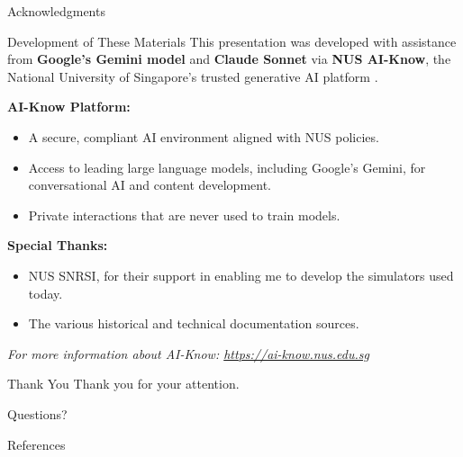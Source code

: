 \documentclass[aspectratio=169]{beamer}
\begin{document}
\begin{frame}[allowframebreaks]{Acknowledgments}
    \begin{block}{Development of These Materials}
        This presentation was developed with assistance 
		from \textbf{Google's Gemini model} and \textbf{Claude Sonnet} via \textbf{NUS AI-Know}, the 
		National University of Singapore's trusted generative AI platform 
		\cite{aiknow2026prke,
		aiknow2026gemini}.
    \end{block}

    \vspace{1em}
    \textbf{AI-Know Platform:}
    \begin{itemize}
        \item A secure, compliant AI environment aligned with NUS policies.
        \item Access to leading large language models, including Google's Gemini, for conversational AI and content development.
        \item Private interactions that are never used to train models.
    \end{itemize}

    \vspace{1em}
    \textbf{Special Thanks:}
    \begin{itemize}
        \item NUS SNRSI, for their support in enabling me to develop the simulators used today.
        \item The various historical and technical documentation sources.
    \end{itemize}

    \vspace{1em}
    \centering
    \small
    \textit{For more information about AI-Know: \href{https://ai-know.nus.edu.sg}{https://ai-know.nus.edu.sg}}
\end{frame}

\begin{frame}[allowframebreaks]{Thank You}
    \centering
    \Huge Thank you for your attention.
    
    \vspace{2em}
    \LARGE Questions?
\end{frame}

\begin{frame}[allowframebreaks]{References}
    \printbibliography[heading=none]
\end{frame}
\end{document}
